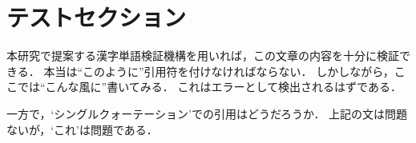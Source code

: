 \section{テストセクション}

本研究で提案する漢字単語検証機構を用いれば，この文章の内容を十分に検証できる．
本当は``このように''引用符を付けなければならない．
しかしながら，ここでは“こんな風に”書いてみる．
これはエラーとして検出されるはずである．

一方で，`シングルクォーテーション'での引用はどうだろうか．
上記の文は問題ないが，‘これ’は問題である．
